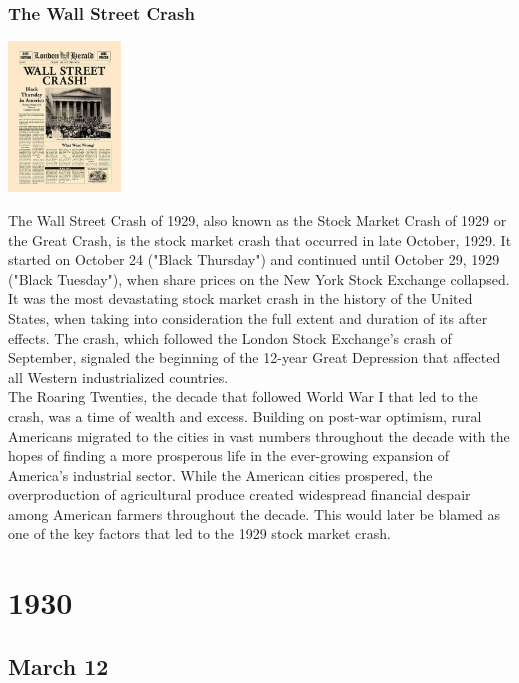 \documentclass[11pt]{report}
\begin{document}
\subsection{The Wall Street Crash}
\vspace{2mm}\begin{center}\includegraphics[width=3cm]{./img/wallStreetCrash.jpg}\end{center}
The Wall Street Crash of 1929, also known as the Stock Market Crash of 1929 or the Great Crash, is the stock market crash that occurred in late October, 1929. It started on October 24 ("Black Thursday") and continued until October 29, 1929 ("Black Tuesday"), when share prices on the New York Stock Exchange collapsed.\\
It was the most devastating stock market crash in the history of the United States, when taking into consideration the full extent and duration of its after effects. The crash, which followed the London Stock Exchange's crash of September, signaled the beginning of the 12-year Great Depression that affected all Western industrialized countries.\\
\indent The Roaring Twenties, the decade that followed World War I that led to the crash, was a time of wealth and excess. Building on post-war optimism, rural Americans migrated to the cities in vast numbers throughout the decade with the hopes of finding a more prosperous life in the ever-growing expansion of America's industrial sector. While the American cities prospered, the overproduction of agricultural produce created widespread financial despair among American farmers throughout the decade. This would later be blamed as one of the key factors that led to the 1929 stock market crash.

\chapter{1930}
\section{March 12}
\end{document}
